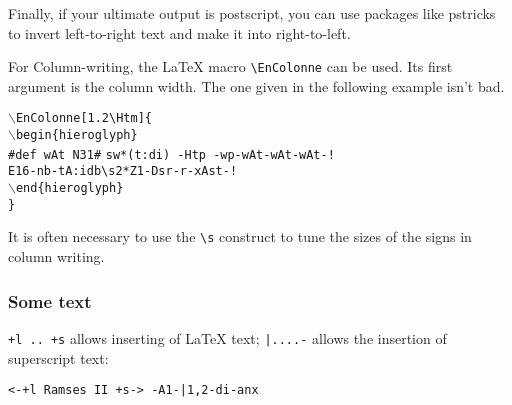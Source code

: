 \documentclass[final]{article}
\def\Backslash{$\backslash$}
\begin{document}
Finally, if your ultimate output is postscript, you can use packages
like pstricks to invert left-to-right text and make it into
right-to-left.

For Column-writing, the \LaTeX{} macro \verb/\EnColonne/ can be used.
Its first argument is the column width. The one given in the following
example isn't bad. 
\begin{flushleft}
  \Backslash{}\verb/EnColonne[1.2\Htm]{/\\
  \Backslash\verb/begin{hieroglyph}/\\
  \verb/#def wAt N31#/
  \verb/sw*(t:di) -Htp -wp-wAt-wAt-wAt-!/\\
  \verb/E16-nb-tA:idb\s2*Z1-Dsr-r-xAst-!/\\
  \Backslash\verb/end{hieroglyph}/\\
  \verb/}/\\
\end{flushleft}
\begin{center}
\end{center}
It is often necessary to use the \verb/\s/ construct to tune the sizes
of the signs in column writing. 


\subsubsection{Some text}

\verb|+l .. +s| allows inserting of \LaTeX{} text;  
\verb/|....-/ allows the insertion of superscript text:
\begin{verbatim}
<-+l Ramses II +s-> -A1-|1,2-di-anx
\end{verbatim}
\begin{hieroglyph}{\leavevmode {}%
\HwordSpace
{}\HinterSignsSpace
{}\HinterSignsSpace
{}\HinterSignsSpace
{}}\end{hieroglyph}
\end{document}

